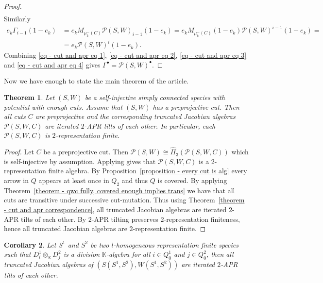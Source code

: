 \documentclass[a4paper, reqno]{amsart}
\newtheorem{mythm}{Theorem}[section]
\newtheorem{mycor}[mythm]{Corollary}
\theoremstyle{definition}
\newcommand{\K}{\mathbb{K}}
\begin{document}
\begin{proof}
\begin{equation}
\begin{aligned}
		\end{aligned}
	\end{equation}
	Similarly
	\begin{equation}\label{eq - cut and apr eq 4}
		\begin{aligned}
			e_k \Gamma_{i-1}(1-e_k) &= e_k M_{\mu_k^-(C)} \mathcal{P}(S, W)_{i-1} (1-e_k) = e_k M_{\mu_k^-(C)}(1-e_k) \mathcal{P}(S, W)^{i-1}(1-e_k) = \\
			&= e_k \mathcal{P}(S, W)^{i}(1-e_k).
		\end{aligned}
	\end{equation}
	Combining \eqref{eq - cut and apr eq 1}, \eqref{eq - cut and apr eq 2}, \eqref{eq - cut and apr eq 3} and \eqref{eq - cut and apr eq 4} gives $\Gamma^\bullet = \mathcal{P}(S, W)^\bullet$.
\end{proof}

Now we have enough to state the main theorem of the article.

\begin{mythm}\label{theorem - jacobian 2apr tils of each other}
	Let $(S, W)$ be a self-injective simply connected species with potential with enough cuts. Assume that $(S, W)$ has a preprojective cut. Then all cuts $C$ are preprojective and the corresponding truncated Jacobian algebras $\mathcal{P}(S, W, C)$ are iterated $2$-APR tilts of each other. In particular, each $\mathcal{P}(S, W, C)$ is $2$-representation finite.
\end{mythm}

\begin{proof}
	Let $C$ be a preprojective cut. Then $\mathcal{P}(S, W) \cong \widehat{\Pi}_3(\mathcal{P}(S, W, C))$ which is self-injective by assumption. Applying \cite[Corollary 3.7]{IO13Stablecateofhigherpreproj} gives that $\mathcal{P}(S, W, C)$ is a $2$-representation finite algebra. By Proposition~\ref{proposition - every cut is alg} every arrow in $Q$ appears at least once in $Q_2$ and thus $Q$ is covered. By applying Theorem~\ref{theorem - qwc fully, covered enough implies trans} we have that all cuts are transitive under successive cut-mutation. Thus using Theorem~\ref{theorem - cut and apr correspondence}, all truncated Jacobian algebras are iterated $2$-APR tilts of each other. By \cite[Corollary 4.3]{IO11nRFalgandnAPRtilt} $2$-APR tilting preserves $2$-representation finiteness, hence all truncated Jacobian algebras are $2$-representation finite.
\end{proof}

\begin{mycor}
	Let $S^1$ and $S^2$ be two $l$-homogeneous representation finite species such that $D^1_i\otimes_\K D^2_j$ is a division $\K$-algebra for all $i\in Q^1_0$ and $j\in Q^2_0$, then all truncated Jacobian algebras of $(S(S^1, S^2), W(S^1, S^2))$ are iterated $2$-APR tilts of each other.
\end{mycor}
\end{document}
